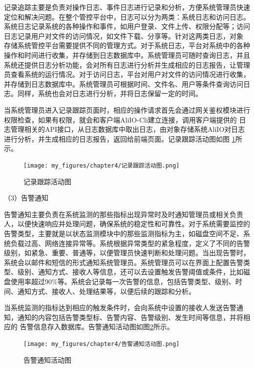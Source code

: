 记录追踪主要是负责对操作日志、事件日志进行记录和分析，方便系统管理员快速定位和解决问题。在整个管控平台中，日志可以分为两类：系统日志和访问日志。
系统日志记录系统的各种操作和事件，如用户登录、文件上传、权限分配等；访问日志记录用户对文件的访问情况，如文件下载、分享等。针对这两类日志，对象
存储系统管控平台需要提供不同的管理方式。对于系统日志，平台对系统中的各种操作和时间进行收集，并存储到日志数据库中。系统管理员可随时查询日志，并且
系统还提供日志分析功能，会对所有日志进行分析并生成相应的日志报告，让管理员查看系统的运行情况。对于访问日志，平台对用户对文件的访问情况进行收集，
并存储到日志数据库中。系统管理员可根据时间、文件名、用户等条件查询访问日志。同样，系统也会对日志进行分析，并将日志保留一定的时间。

当系统管理员进入记录跟踪页面时，相应的操作请求首先会通过网关鉴权模块进行权限检查，如果有权限，就会和客户端AliIO-Cli建立连接，调用客户端提供的
日志管理相关的API接口，从日志数据库中取出日志，由对象存储系统AliIO对日志进行分析，并生成相应的日志报告，返回给前端页面。记录跟踪活动图如图
 \ref{fig:记录跟踪活动图}所示。

\begin{figure}[htb]
    \centering
    \texttt{[image: my\_figures/chapter4/记录跟踪活动图.png]}
    \caption{记录跟踪活动图}
    \label{fig:记录跟踪活动图}
\end{figure}


（3）告警通知

告警通知主要负责在系统监测的那些指标出现异常时及时通知管理员或相关负责人，以便快速响应并处理问题，确保系统的稳定性和可靠性。对于系统需要监控的
告警类型，主要就是以状态监测模块中的那些监测指标为主，如磁盘空间不足、系统负载过高、网络连接异常等。系统根据异常类型的紧急程度，定义了不同的告警
级别，如紧急、重要、普通等，以便管理员快速判断和处理问题。当出现告警时，系统会以邮件和短信的形式通知系统管理员。系统管理员可以在界面上配置告警类
型、级别、通知方式、接收人等信息，还可以去设置触发告警阈值或条件，比如磁盘使用率超过90\%等。系统会记录每一次告警的信息，包括告警类型、级别、时
间、通知方式、接收人、处理结果等，以便后续的跟踪和分析。

当系统监测的指标达到相应的触发条件时，会向系统中设置的接收人发送告警通知，通知的内容包括告警类型标、告警内容、告警级别、发生时间等信息，并将相应的
告警信息存入数据库。告警通知活动图如图\ref{fig:告警通知活动图}所示。

\begin{figure}[htb]
    \centering
    \texttt{[image: my\_figures/chapter4/告警通知活动图.png]}
    \caption{告警通知活动图}
    \label{fig:告警通知活动图}
\end{figure}


